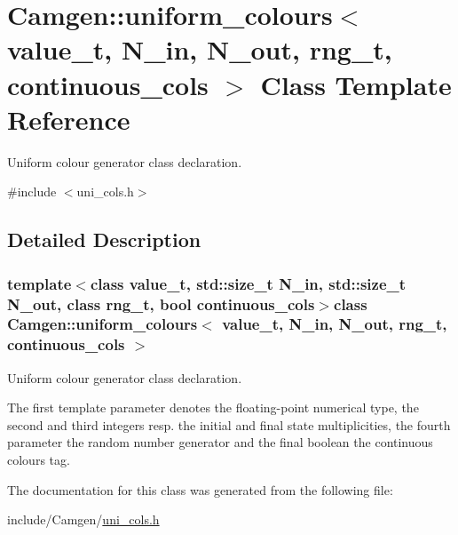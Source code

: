\hypertarget{a00557}{}\section{Camgen\+:\+:uniform\+\_\+colours$<$ value\+\_\+t, N\+\_\+in, N\+\_\+out, rng\+\_\+t, continuous\+\_\+cols $>$ Class Template Reference}
\label{a00557}


Uniform colour generator class declaration.  




{\ttfamily \#include $<$uni\+\_\+cols.\+h$>$}



\subsection{Detailed Description}
\subsubsection*{template$<$class value\+\_\+t, std\+::size\+\_\+t N\+\_\+in, std\+::size\+\_\+t N\+\_\+out, class rng\+\_\+t, bool continuous\+\_\+cols$>$class Camgen\+::uniform\+\_\+colours$<$ value\+\_\+t, N\+\_\+in, N\+\_\+out, rng\+\_\+t, continuous\+\_\+cols $>$}

Uniform colour generator class declaration. 

The first template parameter denotes the floating-\/point numerical type, the second and third integers resp. the initial and final state multiplicities, the fourth parameter the random number generator and the final boolean the continuous colours tag. 

The documentation for this class was generated from the following file\+:\begin{DoxyCompactItemize}
\item 
include/\+Camgen/\hyperlink{a00818}{uni\+\_\+cols.\+h}\end{DoxyCompactItemize}
